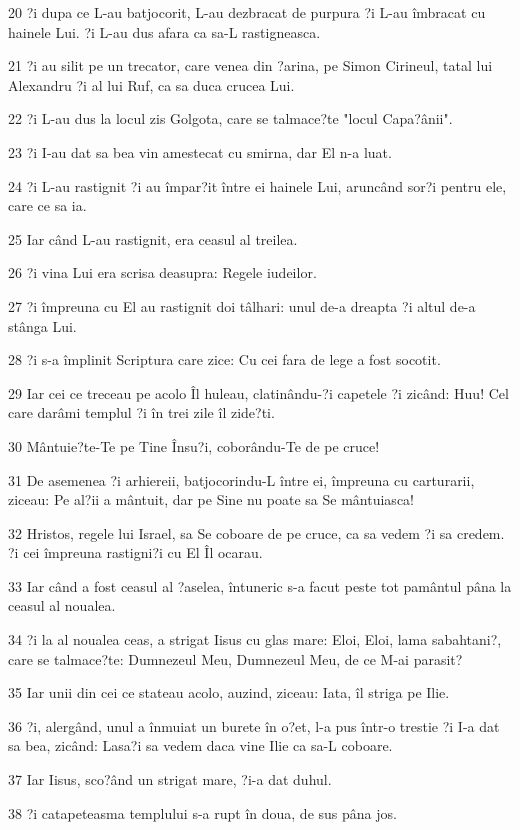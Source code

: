 \par 20 ?i dupa ce L-au batjocorit, L-au dezbracat de purpura ?i L-au îmbracat cu hainele Lui. ?i L-au dus afara ca sa-L rastigneasca.
\par 21 ?i au silit pe un trecator, care venea din ?arina, pe Simon Cirineul, tatal lui Alexandru ?i al lui Ruf, ca sa duca crucea Lui.
\par 22 ?i L-au dus la locul zis Golgota, care se talmace?te "locul Capa?ânii".
\par 23 ?i I-au dat sa bea vin amestecat cu smirna, dar El n-a luat.
\par 24 ?i L-au rastignit ?i au împar?it între ei hainele Lui, aruncând sor?i pentru ele, care ce sa ia.
\par 25 Iar când L-au rastignit, era ceasul al treilea.
\par 26 ?i vina Lui era scrisa deasupra: Regele iudeilor.
\par 27 ?i împreuna cu El au rastignit doi tâlhari: unul de-a dreapta ?i altul de-a stânga Lui.
\par 28 ?i s-a împlinit Scriptura care zice: Cu cei fara de lege a fost socotit.
\par 29 Iar cei ce treceau pe acolo Îl huleau, clatinându-?i capetele ?i zicând: Huu! Cel care darâmi templul ?i în trei zile îl zide?ti.
\par 30 Mântuie?te-Te pe Tine Însu?i, coborându-Te de pe cruce!
\par 31 De asemenea ?i arhiereii, batjocorindu-L între ei, împreuna cu carturarii, ziceau: Pe al?ii a mântuit, dar pe Sine nu poate sa Se mântuiasca!
\par 32 Hristos, regele lui Israel, sa Se coboare de pe cruce, ca sa vedem ?i sa credem. ?i cei împreuna rastigni?i cu El Îl ocarau.
\par 33 Iar când a fost ceasul al ?aselea, întuneric s-a facut peste tot pamântul pâna la ceasul al noualea.
\par 34 ?i la al noualea ceas, a strigat Iisus cu glas mare: Eloi, Eloi, lama sabahtani?, care se talmace?te: Dumnezeul Meu, Dumnezeul Meu, de ce M-ai parasit?
\par 35 Iar unii din cei ce stateau acolo, auzind, ziceau: Iata, îl striga pe Ilie.
\par 36 ?i, alergând, unul a înmuiat un burete în o?et, l-a pus într-o trestie ?i I-a dat sa bea, zicând: Lasa?i sa vedem daca vine Ilie ca sa-L coboare.
\par 37 Iar Iisus, sco?ând un strigat mare, ?i-a dat duhul.
\par 38 ?i catapeteasma templului s-a rupt în doua, de sus pâna jos.

